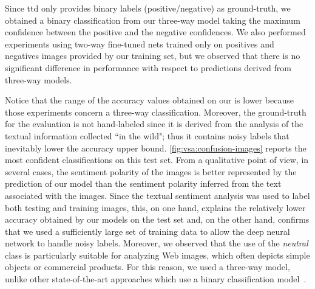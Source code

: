 Since \gls{ttd} only provides binary labels (positive/negative) as ground-truth, we obtained a binary classification from our three-way model taking the maximum confidence between the positive and the negative confidences.
We also performed experiments using two-way fine-tuned nets trained only on positives and negatives images provided by our training set, but we observed that there is no significant difference in performance with respect to predictions derived from three-way models.

Notice that the range of the accuracy values obtained on our \BTSA{} is lower because those experiments concern a three-way classification.
Moreover, the ground-truth for the evaluation is not hand-labeled since it is derived from the analysis of the textual information collected ``in the wild";
thus it contains noisy labels that inevitably lower the accuracy upper bound. %
\ref{fig:vsa:confusion-images} reports the most confident classifications on this test set.
From a qualitative point of view, in several cases, the sentiment polarity of the images is better represented by the prediction of our model than the sentiment polarity inferred from the text associated with the images.
Since the textual sentiment analysis was used to label both testing and training images, this, on one hand, explains the relatively lower accuracy obtained by our models on the \BTSA{} test set and, on the other hand, confirms that we used a sufficiently large set of training data to allow the deep neural network to handle noisy labels.
Moreover, we observed that the use of the \emph{neutral} class is particularly suitable for analyzing Web images, which often depicts simple objects or commercial products.
For this reason, we used a three-way model, unlike other state-of-the-art approaches which use a binary classification model~\cite{campos2017pixels,islam2016visual,you2015robust}.


